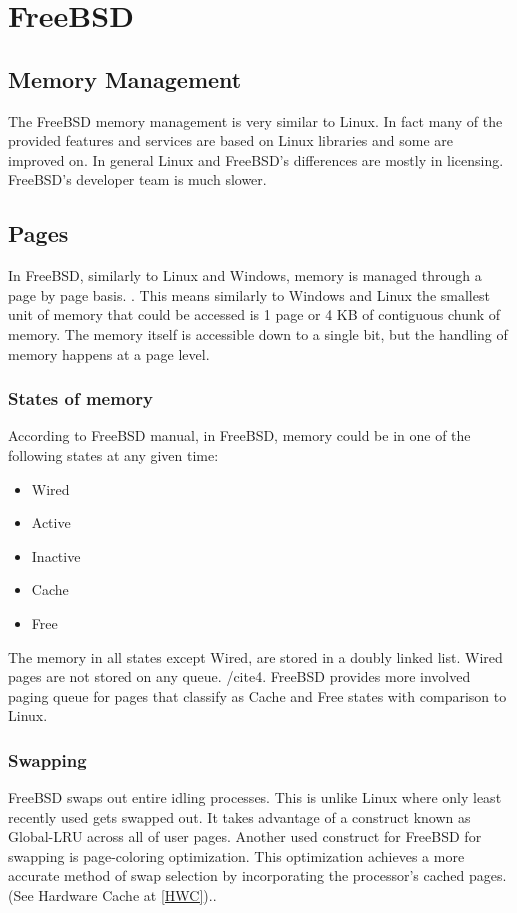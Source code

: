 \documentclass[journal,10pt,onecolumn,compsoc,letterpaper,draftclsnofoot,table,xcdraw]{IEEEtran} \usepackage[margin=0.75in]{geometry}
\begin{document}
\section{FreeBSD}
\subsection{Memory Management}
\noindent The FreeBSD memory management is very similar to Linux. In fact many of the provided features and services are based on Linux libraries and some are improved on. In general Linux and FreeBSD's differences are mostly in licensing. FreeBSD's developer team is much slower.
\subsection{Pages}
\noindent In FreeBSD, similarly to Linux and Windows, memory is managed through a page by page basis. \cite{4}. This means similarly to Windows and Linux the smallest unit of memory that could be accessed is 1 page or 4 KB of contiguous chunk of memory. The memory itself is accessible down to a single bit, but the handling of memory happens at a page level.
\subsubsection{States of memory}
\noindent According to FreeBSD manual, in FreeBSD, memory could be in one of the following states at any given time:
\begin{itemize}
\item Wired
\item Active
\item Inactive
\item Cache
\item Free
\end{itemize}
\noindent The memory in all states except Wired, are stored in a doubly linked list. Wired pages are not stored on any queue. /cite{4}. FreeBSD provides more involved paging queue for pages that classify as Cache and Free states with comparison to Linux.
\subsubsection{Swapping}
\noindent FreeBSD swaps out entire idling processes. This is unlike Linux where only least recently used gets swapped out. It takes advantage of a construct known as Global-LRU across all of user pages. Another used construct for FreeBSD for swapping is page-coloring optimization. This optimization achieves a more accurate method of swap selection by incorporating the processor's cached pages. (See Hardware Cache at \ref{HWC}).\cite{5}.
\end{document}
